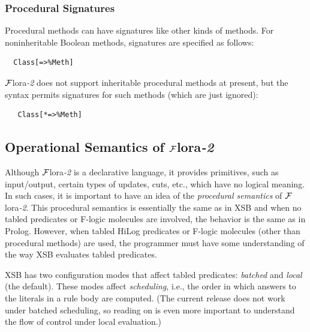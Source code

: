 \documentclass[11pt]{article}
\newcommand{\FLORA}{{\mbox{\sc ${\cal F}${lora}\rm\emph{-2}}}\xspace}
\newcommand{\fl}{\mbox{F-logic}\xspace}
\begin{document}
\subsubsection{Procedural Signatures}

Procedural methods can have signatures like other kinds of methods.
For noninheritable Boolean methods, signatures are specified as follows:
\begin{verbatim}
  Class[=>%Meth]
\end{verbatim}
\FLORA does not support inheritable procedural methods at present, but the
syntax permits signatures for such methods (which are just ignored):
\begin{verbatim}
   Class[*=>%Meth]
\end{verbatim}

\subsection{Operational Semantics of \FLORA}\label{sec-flora-procedural}

Although \FLORA is a declarative language, it provides primitives, such as
input/output, certain types of updates, cuts, etc., which have no logical
meaning. In such cases, it is important to have an idea of the
\emph{procedural semantics} of \FLORA. This procedural semantics is
essentially the same as in XSB and when no tabled predicates or \fl molecules
are involved, the behavior is the same as in Prolog. However, when tabled
HiLog predicates or \fl molecules (other than procedural methods) are used,
the programmer must have some understanding of the way XSB evaluates tabled
predicates.

XSB has two configuration modes that affect tabled predicates:
\emph{batched} and \emph{local} (the default). These modes affect
\emph{scheduling}, i.e., the order in which answers to the literals
in a rule body are computed.
(The current release does not work under batched scheduling, so reading on
is even more important to understand the flow of control under local
evaluation.)
\end{document}
